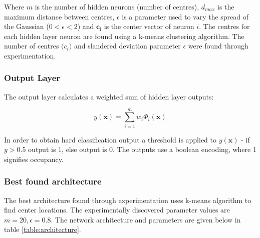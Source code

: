 \documentclass[a4paper, 11pt]{article}
\begin{document}
Where $m$ is the number of hidden neurons (number of centres), $d_{max}$ is the maximum distance between centres, $\epsilon$ is a parameter used to vary the spread of the Gaussian ($0<\epsilon<2$) and $\boldsymbol{c_i}$ is the center vector of neuron $i$. The centres for each hidden layer neuron are found using a k-means clustering algorithm. The number of centres $\boldsymbol(c_i)$ and slandered deviation parameter $\epsilon$ were found through experimentation.

\subsubsection*{Output Layer}
The output layer calculates a weighted sum of hidden layer outputs:

\begin{equation}
y(\boldsymbol{x}) = \displaystyle\sum_{i=1}^{m} w_i \Phi_i(\boldsymbol{x})
\end{equation}

In order to obtain hard classification output a threshold is applied to $y(\boldsymbol{x})$ - if $y>0.5$ output is 1, else output is 0. The outputs use a boolean encoding, where 1 signifies occupancy.

\subsubsection*{Best found architecture}
The best architecture found through experimentation uses k-means algorithm to find center locations. The experimentally discovered parameter values are $m = 20, \epsilon = 0.8$. The network architecture and parameters are given below in table \ref{table:architecture}.
\end{document}
